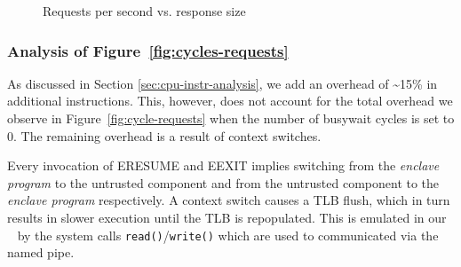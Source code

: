 \documentclass[../../../main.tex]{subfiles}
\begin{document}
\begin{figure}[H]
  \centering
  \caption{Requests per second vs. response size}
  \label{fig:sizreqs}
\end{figure}

\subsubsection*{Analysis of Figure~\ref{fig:cycles-requests}}
As discussed in Section \ref{sec:cpu-instr-analysis}, we add an
overhead of \textasciitilde15\% in additional instructions. This,
however, does not account for the total overhead we observe in
Figure~\ref{fig:cycle-requests} when the number of busywait cycles is
set to 0. The remaining overhead is a result of context switches.

Every invocation of ERESUME and EEXIT implies switching from the
\textit{enclave program} to the untrusted component and from the
untrusted component to the \textit{enclave program} respectively. A
context switch causes a TLB flush, which in turn results in slower
execution until the TLB is repopulated. This is emulated in our
\enclavemodel~ by the system calls \texttt{read()}/\texttt{write()}
which are used to communicated via the named pipe.
\end{document}
